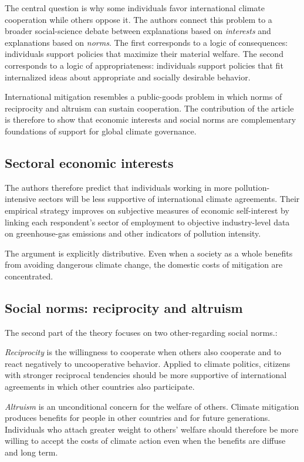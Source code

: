 The central question is why some individuals favor international climate cooperation while others oppose it. The authors connect this problem to a broader social-science debate between explanations based on \textit{interests} and explanations based on \textit{norms}. The first corresponds to a logic of consequences: individuals support policies that maximize their material welfare. The second corresponds to a logic of appropriateness: individuals support policies that fit internalized ideas about appropriate and socially desirable behavior.

International mitigation resembles a public-goods problem in which norms of reciprocity and altruism can sustain cooperation. The contribution of the article is therefore to show that economic interests and social norms are complementary foundations of support for global climate governance.

\subsection{Sectoral economic interests}

The authors therefore predict that individuals working in more pollution-intensive sectors will be less supportive of international climate agreements. Their empirical strategy improves on subjective measures of economic self-interest by linking each respondent's sector of employment to objective industry-level data on greenhouse-gas emissions and other indicators of pollution intensity.

The argument is explicitly distributive. Even when a society as a whole benefits from avoiding dangerous climate change, the domestic costs of mitigation are concentrated.

\subsection{Social norms: reciprocity and altruism}

The second part of the theory focuses on two other-regarding social norms.:

\textit{Reciprocity} is the willingness to cooperate when others also cooperate and to react negatively to uncooperative behavior. Applied to climate politics, citizens with stronger reciprocal tendencies should be more supportive of international agreements in which other countries also participate.

\textit{Altruism} is an unconditional concern for the welfare of others. Climate mitigation produces benefits for people in other countries and for future generations. Individuals who attach greater weight to others' welfare should therefore be more willing to accept the costs of climate action even when the benefits are diffuse and long term.

